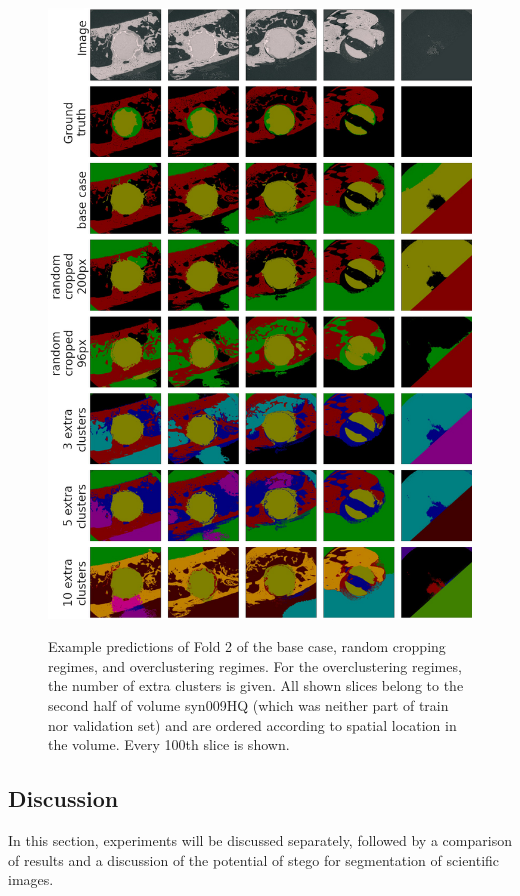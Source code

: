 \begin{figure}[p]
    \centering
    \includegraphics[width=\textwidth]{pictures/experiment_2/for_paper_all_experiments_example_predictions_2_Fold2}\\
    \caption[Comparison of Predictions for Same Fold]{Example predictions of Fold 2 of the base case, random cropping regimes, and overclustering regimes. For the overclustering regimes, the number of extra clusters is given. All shown slices belong to the second half of volume syn009HQ (which was neither part of train nor validation set) and are ordered according to spatial location in the volume. Every 100th slice is shown.}
    \label{fig:example-predictions-fold2}
\end{figure}
\FloatBarrier

\subsection{Discussion}
In this section, experiments will be discussed separately, followed by a comparison of results and a discussion of the potential of \gls{stego} for segmentation of scientific images.

